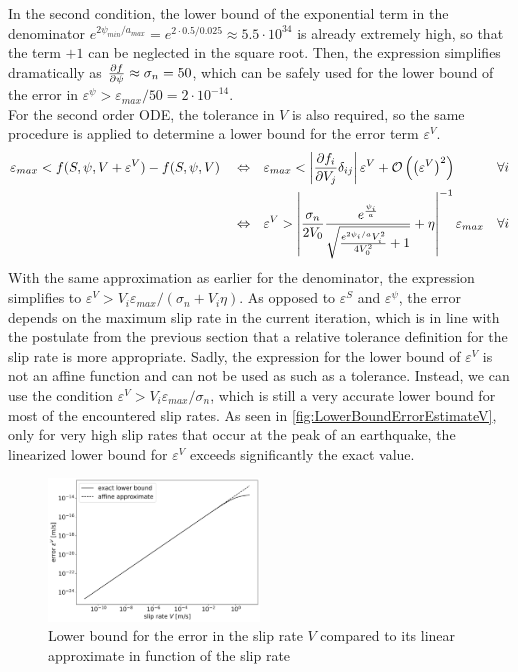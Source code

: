 In the second condition, the lower bound of the exponential term in the denominator $e^{2\psi_{min}/a_{max}} = e^{2 \cdot 0.5 / 0.025} \approx 5.5\cdot10^{34}$ is already extremely high, so that the term $+1$ can be neglected in the square root. Then, the expression simplifies dramatically as $\pdv{f}{\psi} \approx \sigma_n = 50$, which can be safely used for the lower bound of the error in $\varepsilon^\psi > \varepsilon_{max}/50 = 2\cdot10^{-14}$. \\
For the second order ODE, the tolerance in $V$ is also required, so the same procedure is applied to determine a lower bound for the error term $\varepsilon^V$.
\begin{align}
	&\varepsilon_{max} < f(S,\psi,V+\varepsilon^{V}) - f(S,\psi,V)
	&&\Leftrightarrow&&
	\varepsilon_{max} < \left|\pdv{f_i}{V_j}\delta_{ij}\right|\varepsilon^V + \mathcal{O}\left(\left(\varepsilon^V\right)^2\right) & \forall i \\
	&&&\Leftrightarrow &&
	\varepsilon^V > \left|\frac{\sigma_n}{2V_0}\frac{ e^{\frac{\psi_i}{a}}}{\sqrt{\frac{e^{2\psi_i/a}V_i^2}{4V_0^2} + 1}} + \eta\right|^{-1}\varepsilon_{max} & \forall i
\end{align}
With the same approximation as earlier for the denominator, the expression simplifies to $\varepsilon^V > V_i\varepsilon_{max}/(\sigma_n + V_i\eta)$. As opposed to $\varepsilon^S$ and $\varepsilon^\psi$, the error depends on the maximum slip rate in the current iteration, which is in line with the postulate from the previous section that a relative tolerance definition for the slip rate is more appropriate. Sadly, the expression for the lower bound of $\varepsilon^V$ is not an affine function and can not be used as such as a tolerance. Instead, we can use the condition $\varepsilon^V > V_i\varepsilon_{max}/\sigma_n$, which is still a very accurate lower bound for most of the encountered slip rates. As seen in \autoref{fig:LowerBoundErrorEstimateV}, only for very high slip rates that occur at the peak of an earthquake, the linearized lower bound for $\varepsilon^V$ exceeds significantly the exact value.
\begin{figure}[H]
	\centering
	\includegraphics[width=0.5\textwidth]{images/ErrorRelationPSI_VAbsoluteRelative.png}
	\caption{Lower bound for the error in the slip rate $V$ compared to its linear approximate in function of the slip rate}
	\label{fig:LowerBoundErrorEstimateV}
\end{figure}
